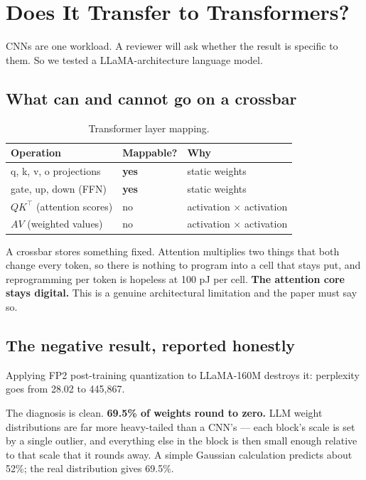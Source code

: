 \documentclass[11pt,a4paper]{report}
\begin{document}
\chapter{Does It Transfer to Transformers?}

CNNs are one workload. A reviewer will ask whether the result is specific to
them. So we tested a LLaMA-architecture language model.

\section{What can and cannot go on a crossbar}

\begin{table}[h]
\centering
\caption{Transformer layer mapping.}
\begin{tabular}{lll}
\toprule
Operation & Mappable? & Why \\
\midrule
q, k, v, o projections & \textbf{yes} & static weights \\
gate, up, down (FFN) & \textbf{yes} & static weights \\
$Q K^{\!\top}$ (attention scores) & no & activation $\times$ activation \\
$A V$ (weighted values) & no & activation $\times$ activation \\
\bottomrule
\end{tabular}
\end{table}

A crossbar stores something fixed. Attention multiplies two things that both
change every token, so there is nothing to program into a cell that stays put,
and reprogramming per token is hopeless at 100 pJ per cell. \textbf{The
attention core stays digital.} This is a genuine architectural limitation and
the paper must say so.

\section{The negative result, reported honestly}

Applying FP2 post-training quantization to LLaMA-160M destroys it: perplexity
goes from 28.02 to 445{,}867.

The diagnosis is clean. \textbf{69.5\% of weights round to zero.} LLM weight
distributions are far more heavy-tailed than a CNN's --- each block's scale is
set by a single outlier, and everything else in the block is then small enough
relative to that scale that it rounds away. A simple Gaussian calculation
predicts about 52\%; the real distribution gives 69.5\%.
\end{document}

